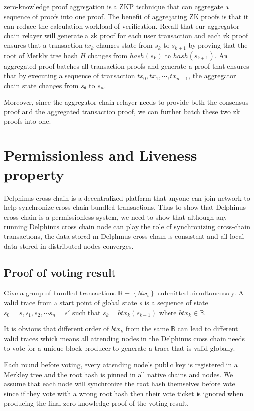 \documentclass[pageno]{jpaper}
\begin{document}
zero-knowledge proof aggregation is a ZKP technique that can aggregate a sequence of proofs into one proof. The benefit of aggregating ZK proofs is that it can reduce the calculation workload of verification. Recall that our aggregator chain relayer will generate a zk proof for each user transaction and each zk proof ensures that a transaction $tx_k$ changes state from $s_k$ to $s_{k+1}$ by proving that the root of Merkly tree hash $H$ changes from $hash(s_k)$ to $hash(s_{k+1})$. An aggregated proof batches all transaction proofs and generate a proof that ensures that by executing a sequence of transaction $tx_0, tx_1, \cdots, tx_{n-1}$, the aggregator chain state changes from $s_0$ to $s_n$. 

Moreover, since the aggregator chain relayer needs to provide both the consensus proof and the aggregated transaction proof, we can further batch these two zk proofs into one.


\section {Permissionless and Liveness property}
\label{permissionless-liveness}

Delphinus cross-chain is a decentralized platform that anyone can join network to help synchronize cross-chain bundled transactions. Thus to show that Delphinus cross chain is a permissionless system, we need to show that although any running Delphinus cross chain node can play the role of synchronizing cross-chain transactions, the data stored in Delphinus cross chain is consistent and all local data stored in distributed nodes converges.

\subsection{Proof of voting result}
Give a group of bundled transactions $\mathbb{B} = \left\{btx_i\right\}$ submitted simultaneously. A valid trace from a start point of global state $s$ is a sequence of state $s_0=s, s_1, s_2, \cdots s_n = s'$ such that $s_k = btx_k(s_{k-1})$ where $btx_k \in \mathbb{B}$.

It is obvious that different order of $btx_k$ from the same $\mathbb{B}$ can lead to different valid traces which means all attending nodes in the Delphinus cross chain needs to vote for a unique block producer to generate a trace that is valid globally.

Each round before voting, every attending node's public key is registered in a Merkley tree and the root hash is pinned in all native chains and nodes. We assume that each node will synchronize the root hash themselves before vote since if they vote with a wrong root hash then their vote ticket is ignored when producing the final zero-knowledge proof of the voting result.
\end{document}
